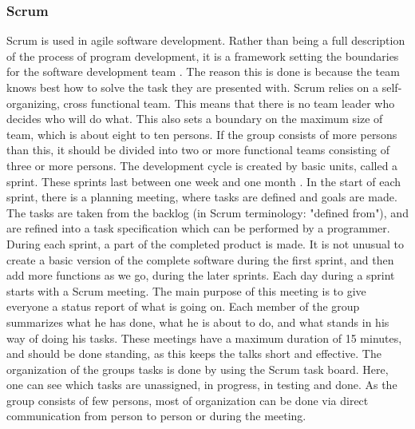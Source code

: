 \subsubsection{Scrum}
Scrum is used in agile software development. Rather than being a full description of the process of program development, it is a framework setting the boundaries for the software development team \cite{bib:asdas}. The reason this is done is because the team knows best how to solve the task they are presented with.
\newline
\newline
Scrum relies on a self-organizing, cross functional team. This means that there is no team leader who decides who will do what. This also sets a boundary on the maximum size of team, which is about eight to ten persons. If the group consists of more persons than this, it should be divided into two or more functional teams consisting of three or more persons.
\newline
\newline
The development cycle is created by basic units, called a sprint. These sprints last between one week and one month \cite{bib:scrum}. In the start of each sprint, there is a planning meeting, where tasks are defined and goals are made. The tasks are taken from the backlog (in Scrum terminology: "defined from"), and are refined into a task specification which can be performed by a programmer. During each sprint, a part of the completed product is made. It is not unusual to create a basic version of the complete software during the first sprint, and then add more functions as we go, during the later sprints.
\newline
\newline
Each day during a sprint starts with a Scrum meeting. The main purpose of this meeting is to give everyone a status report of what is going on. Each member of the group summarizes what he has done, what he is about to do, and what stands in his way of doing his tasks. These meetings have a maximum duration of 15 minutes, and should be done standing, as this keeps the talks short and effective.
\newline
\newline
The organization of the groups tasks is done by using the Scrum task board. Here, one can see which tasks are unassigned, in progress, in testing and done. As the group consists of few persons, most of organization can be done via direct communication from person to person or during the meeting.


